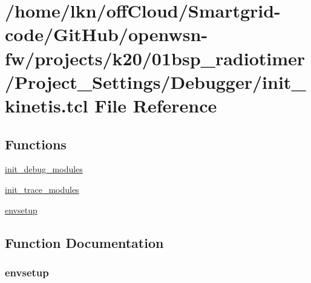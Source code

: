 \hypertarget{01bsp__radiotimer_2_project___settings_2_debugger_2init__kinetis_8tcl}{}\section{/home/lkn/off\+Cloud/\+Smartgrid-\/code/\+Git\+Hub/openwsn-\/fw/projects/k20/01bsp\+\_\+radiotimer/\+Project\+\_\+\+Settings/\+Debugger/init\+\_\+kinetis.tcl File Reference}
\label{01bsp__radiotimer_2_project___settings_2_debugger_2init__kinetis_8tcl}
\subsection*{Functions}
\begin{DoxyCompactItemize}
\item 
\hyperlink{01bsp__radiotimer_2_project___settings_2_debugger_2init__kinetis_8tcl_a10c80471835dee84e7652764cecbb722}{init\+\_\+debug\+\_\+modules}
\item 
\hyperlink{01bsp__radiotimer_2_project___settings_2_debugger_2init__kinetis_8tcl_a8ecf61d10da6f21c5b31426f9a235e03}{init\+\_\+trace\+\_\+modules}
\item 
\hyperlink{01bsp__radiotimer_2_project___settings_2_debugger_2init__kinetis_8tcl_a7f6b4cebda44b6e9d42cc7879ee95e8e}{envsetup}
\end{DoxyCompactItemize}


\subsection{Function Documentation}
\subsubsection[{\texorpdfstring{envsetup}{envsetup}}]{\setlength{\rightskip}{0pt plus 5cm}envsetup}\hypertarget{01bsp__radiotimer_2_project___settings_2_debugger_2init__kinetis_8tcl_a7f6b4cebda44b6e9d42cc7879ee95e8e}{}\label{01bsp__radiotimer_2_project___settings_2_debugger_2init__kinetis_8tcl_a7f6b4cebda44b6e9d42cc7879ee95e8e}


